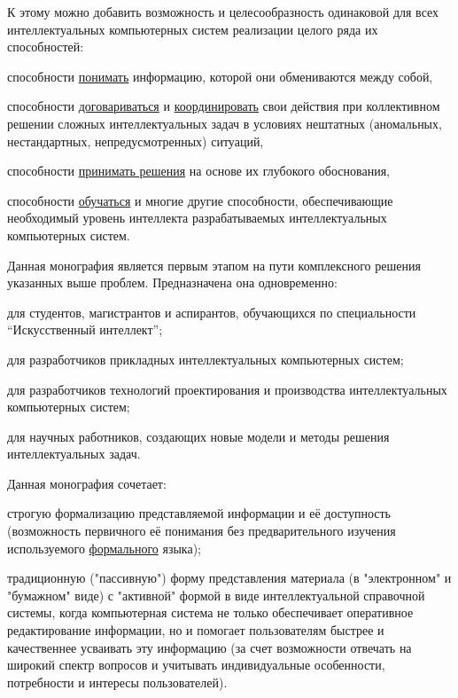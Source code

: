 \begin{SCn}
{К этому можно добавить возможность и целесообразность  одинаковой  для всех интеллектуальных компьютерных систем реализации целого ряда их способностей: 
\begin{scnitemize}
	\item способности \uline{понимать} информацию, которой они обмениваются между собой,
	\item способности  \uline{договариваться} и \uline{координировать} свои действия при коллективном решении сложных интеллектуальных задач в условиях нештатных (аномальных, нестандартных, непредусмотренных) ситуаций,
	\item способности \uline{принимать решения} на основе их глубокого  обоснования,
	\item способности \uline{обучаться} и многие другие способности, обеспечивающие необходимый уровень интеллекта разрабатываемых интеллектуальных компьютерных систем.
\end{scnitemize}

Данная монография является первым этапом на пути комплексного решения указанных выше проблем.
Предназначена она одновременно:
\begin{scnitemize}
	\item для студентов, магистрантов и аспирантов, обучающихся по специальности ``Искусственный интеллект'';
	\item для разработчиков прикладных интеллектуальных компьютерных систем;
	\item для разработчиков технологий проектирования и производства интеллектуальных компьютерных систем;
	\item для научных работников, создающих новые модели и методы решения интеллектуальных задач.
\end{scnitemize}

Данная монография сочетает:
\begin{scnitemize}
	\item строгую формализацию представляемой информации и её доступность (возможность первичного её понимания без предварительного изучения используемого \uline{формального} языка);
	\item традиционную ("пассивную"{}) форму представления материала (в "электронном"{} и "бумажном"{} виде) с "активной"{} формой в виде интеллектуальной справочной системы, когда компьютерная система не только обеспечивает оперативное редактирование информации, но и помогает пользователям  быстрее и  качественнее усваивать эту информацию (за счет возможности отвечать на широкий спектр вопросов и учитывать индивидуальные особенности, потребности и интересы пользователей). 
\end{scnitemize}

}
\end{SCn}
